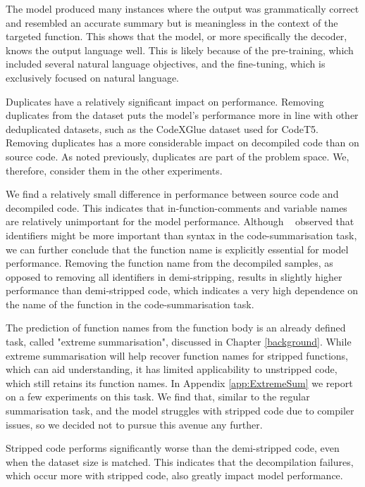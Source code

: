 The model produced many instances where the output was grammatically correct and resembled an accurate summary but is meaningless in the context of the targeted function. This shows that the model, or more specifically the decoder, knows the output language well. This is likely because of the pre-training, which included several natural language objectives, and the fine-tuning, which is exclusively focused on natural language.

Duplicates have a relatively significant impact on performance. Removing duplicates from the dataset puts the model's performance more in line with other deduplicated datasets, such as the CodeXGlue dataset used for CodeT5. Removing duplicates has a more considerable impact on decompiled code than on source code. As noted previously, duplicates are part of the problem space. We, therefore, consider them in the other experiments.

We find a relatively small difference in performance between source code and decompiled code. This indicates that in-function-comments and variable names are relatively unimportant for the model performance. Although ~\citeauthor{PolyglotCodeBERT} observed that identifiers might be more important than syntax in the code-summarisation task, we can further conclude that the function name is explicitly essential for model performance. Removing the function name from the decompiled samples, as opposed to removing all identifiers in demi-stripping, results in slightly higher performance than demi-stripped code, which indicates a very high dependence on the name of the function in the code-summarisation task. 

The prediction of function names from the function body is an already defined task, called "extreme summarisation", discussed in Chapter \ref{background}. While extreme summarisation will help recover function names for stripped functions, which can aid understanding, it has limited applicability to unstripped code, which still retains its function names. In Appendix \ref{app:ExtremeSum} we report on a few experiments on this task. We find that, similar to the regular summarisation task, and the model struggles with stripped code due to compiler issues, so we decided not to pursue this avenue any further. 

Stripped code performs significantly worse than the demi-stripped code, even when the dataset size is matched. This indicates that the decompilation failures, which occur more with stripped code, also greatly impact model performance.

